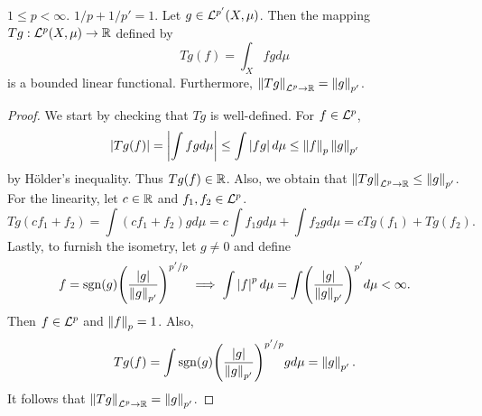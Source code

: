 \begin{proposition}\label{prop:dual_isometry}
    $1\leq p<\infty$. $1/p + 1/p' = 1$. Let $g\in\mathcal{L}^{p'}(X,\mu)$. Then the 
    mapping $Tg:\mathcal{L}^p(X,\mu)\to\mathbb{R}$ defined by 
    \begin{equation*}
        Tg(f) = \int_X fg d\mu
    \end{equation*}
    is a bounded linear functional. Furthermore, $\left\lVert {Tg} \right\rVert_{\mathcal{L}^p\to\mathbb{R}} 
    = \left\lVert {g} \right\rVert_{p'}$.
\end{proposition}
\begin{proof}
    We start by checking that $Tg$ is well-defined. For $f\in\mathcal{L}^p$, 
    \begin{equation*}
        \left\lvert {Tg(f)} \right\rvert = \left\lvert {\int fgd\mu} \right\rvert \leq \int \left\lvert {fg} \right\rvert d\mu \leq \left\lVert {f} \right\rVert_p\left\lVert {g} \right\rVert_{p'}
    \end{equation*}
    by H\"older's inequality. Thus $Tg(f)\in\mathbb{R}$. Also, we obtain that 
    $\left\lVert {Tg} \right\rVert_{\mathcal{L}^p\to\mathbb{R}}\leq\left\lVert {g} \right\rVert_{p'}$. For the linearity, let $c\in\mathbb{R}$ 
    and $f_1,f_2\in\mathcal{L}^p$.
    \begin{equation*}
        Tg(cf_1+f_2) = \int (cf_1+f_2)gd\mu = c\int f_1gd\mu + \int f_2gd\mu 
        = cTg(f_1) + Tg(f_2).
    \end{equation*}
    Lastly, to furnish the isometry, let $g\neq 0$ and define 
    \begin{equation*}
        f = \sgn(g)\pth{\frac{\abs{g}}{\norm{g}_{p'}}}^{p'/p}
        \implies \int \abs{f}^pd\mu 
        = \int \pth{\frac{\abs{g}}{\norm{g}_{p'}}}^{p'}d\mu<\infty.
    \end{equation*}
    Then $f\in\mathcal{L}^p$ and $\left\lVert {f} \right\rVert_p = 1$. Also, 
    \begin{equation*}
        Tg(f) = \int \sgn(g)\pth{\frac{\abs{g}}{\norm{g}_{p'}}}^{p'/p}gd\mu 
        = \norm{g}_{p'}.
    \end{equation*}
    It follows that $\left\lVert {Tg} \right\rVert_{\mathcal{L}^p\to\mathbb{R}} = \left\lVert {g} \right\rVert_{p'}$.
\end{proof}

